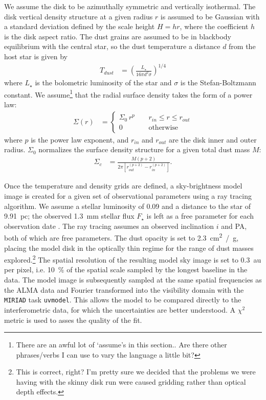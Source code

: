 \documentclass[12pt,oneside]{article}
\begin{document}
We assume the disk to be azimuthally symmetric and vertically isothermal. 
The disk vertical density structure at a given radius $r$ is assumed to be Gaussian with a standard deviation defined by the scale height $H=hr$, where the coefficient $h$ is the disk aspect ratio.
The dust grains are assumed to be in blackbody equilibrium with the central star, so the dust temperature a distance $d$ from the host star is given by
\begin{align}
  T_{dust} &= \left( \frac{L_{\star}}{16 \pi d^2 \sigma} \right)^{1/4}
\end{align}
where $L_{\star}$ is the bolometric luminosity of the star and $\sigma$ is the Stefan-Boltzmann constant. We assume\footnote{There are an awful lot of `assume's in this section.. Are there other phrases/verbs I can use to vary the language a little bit?} that the radial surface density takes the form of a power law: 
\begin{align}
\Sigma(r) &= \begin{cases}
\Sigma_0 \, r^{p} \; \; \; \; & r_{in} \leq r \leq r_{out} \\
0 \; \; \; \; &\mbox{otherwise} 
\end{cases}
\end{align}
where $p$ is the power law exponent, and $r_{in}$ and $r_{out}$ are the disk inner and outer radius. 
$\Sigma_0$ normalizes the surface density structure for a given total dust mass $M$:
\begin{align}
\Sigma_c &= \frac{M \left(p + 2 \right)}{2 \pi \left[ r_{out}^{(p+2)} - r_{in}^{(p+2)} \right]}.
\end{align}

Once the temperature and density grids are defined, a sky-brightness model image is created for a given set of observational parameters using a ray tracing algorithm. We assume a stellar luminosity of \SI{0.09}{\Lsun} and a distance to the star of \SI{9.91}{pc}; the observed \SI{1.3}{mm} stellar flux $F_\star$ is left as a free parameter for each observation date \citep{plavchan09,vanleeuwen07}.
The ray tracing assumes an observed inclination $i$ and PA, both of which are free parameters.
The dust opacity is set to \SI{2.3}{\cm^2 / \gram}, placing the model disk in the optically thin regime for the range of dust masses explored.\footnote{This is correct, right? I'm pretty sure we decided that the problems we were having with the skinny disk run were caused gridding rather than optical depth effects.} 
The spatial resolution of the resulting model sky image is set to \SI{0.3}{au} per pixel, i.e. \SI{10}{\percent} of the spatial scale sampled by the longest baseline in the data. 
The model image is subsequently sampled at the same spatial frequencies as the ALMA data and Fourier transformed into the visibility domain with the \texttt{MIRIAD} task \texttt{uvmodel}. 
This allows the model to be compared directly to the interferometric data, for which the uncertainties are better understood.
A $\chi^2$ metric is used to asses the quality of the fit.
\end{document}
